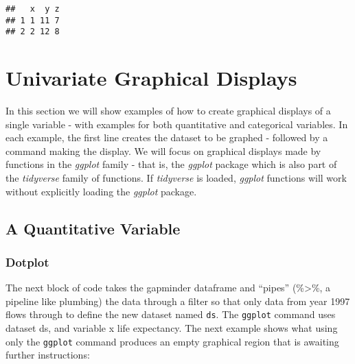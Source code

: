 \documentclass[]{book}
\newenvironment{Shaded}{\begin{snugshade}}{\end{snugshade}}
\newcommand{\KeywordTok}[1]{\textcolor[rgb]{0.13,0.29,0.53}{\textbf{#1}}}
\newcommand{\DataTypeTok}[1]{\textcolor[rgb]{0.13,0.29,0.53}{#1}}
\newcommand{\DecValTok}[1]{\textcolor[rgb]{0.00,0.00,0.81}{#1}}
\newcommand{\StringTok}[1]{\textcolor[rgb]{0.31,0.60,0.02}{#1}}
\newcommand{\CommentTok}[1]{\textcolor[rgb]{0.56,0.35,0.01}{\textit{#1}}}
\newcommand{\OperatorTok}[1]{\textcolor[rgb]{0.81,0.36,0.00}{\textbf{#1}}}
\newcommand{\NormalTok}[1]{#1}
\begin{document}
\begin{verbatim}
##   x  y z
## 1 1 11 7
## 2 2 12 8
\end{verbatim}

\chapter{Univariate Graphical
Displays}\label{UnivariateGraphicalDisplays}

In this section we will show examples of how to create graphical
displays of a single variable - with examples for both quantitative and
categorical variables. In each example, the first line creates the
dataset to be graphed - followed by a command making the display. We
will focus on graphical displays made by functions in the \emph{ggplot}
family - that is, the \emph{ggplot} package which is also part of the
\emph{tidyverse} family of functions. If \emph{tidyverse} is loaded,
\emph{ggplot} functions will work without explicitly loading the
\emph{ggplot} package.

\section{A Quantitative Variable}\label{a-quantitative-variable}

\subsection{Dotplot}\label{dotplot}

The next block of code takes the gapminder dataframe and ``pipes''
(\%\textgreater{}\%, a pipeline like plumbing) the data through a filter
so that only data from year 1997 flows through to define the new dataset
named \texttt{ds}. The \texttt{ggplot} command uses dataset ds, and
variable x life expectancy. The next example shows what using only the
\texttt{ggplot} command produces an empty graphical region that is
awaiting further instructions:

\begin{Shaded}
\end{Shaded}
\end{document}
